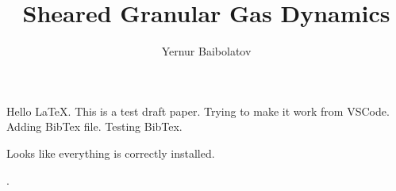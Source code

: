 \documentclass[preprint, aps, pra]{revtex4-1}
\begin{document}
  \title{Sheared Granular Gas Dynamics}
  \author{Yernur Baibolatov}
  \maketitle
  Hello \LaTeX. This is a test draft paper. Trying to make it work from VSCode. Adding BibTex file. Testing BibTex.

  Looks like everything is correctly installed.

  \cite{Brilliantov:2004book, Bodrova:2014epl_steep_distr, Brilliantov:2007pre_coll_dyn, 
  Brilliantov:2007pre_coll_adh, Schwager:2007gm_coll_dyn, Dilley:1993icarus_energy_loss, 
  Garzo:2012pre_maxwell_gas, DeSoria:2013pre_hydro_gas, Schaefer:1996jphys_force_schemes, 
  Garzo:2007pre_enskog_I, Garzo:2007pre_enskog_II, Garzo:1999pre_gran_mixture, 
  Geminard:2004pre_gran_pressure, Quinn:2010astro_hill_simplectic, Barrat:2002gm_binary_mix, 
  Hoffmann:2013astrolett_vertical_relax, Cuendet:2007jchem_md_simul, Uecker:2009pre_part_energy, 
  Morishima:2006icarus_dense_ring_simul, Ohtsuki:1998icarus_vel_disp, Salo:2010icarus_N_body, 
  Greenberg:1988icarus, Spahn:2006gamm_hydro_rings, Lois:2007pre_shear_flow, 
  Spahn:2004euro_lett_kinetic_fraggr, Spahn:2000icarus_stability_analysis, WisdomTremaine:1988astro}.


  
  
\end{document}
